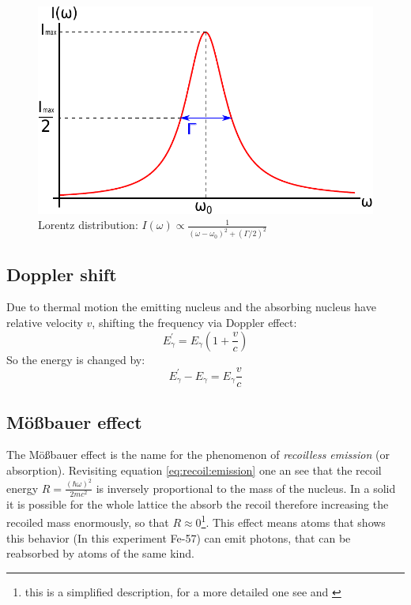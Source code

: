 \begin{figure}[hpbt]
	\centering
	\includegraphics[height=0.25\textheight]{graphics/Lorentz.pdf}
	\caption[Lorentz distribution]{Lorentz distribution: $I(\omega) \propto \frac{1}{(\omega-\omega_0)^2+(\Gamma /2)^2}$\\}
	\label{fig:principles:lorentz}
\end{figure}

\subsection{Doppler shift}
Due to thermal motion the emitting nucleus and the absorbing nucleus have relative velocity $v$, shifting the frequency via Doppler effect:  
\begin{equation}
E_\gamma^{'} = E_\gamma (1+\frac{v}{c}) 
\label{eq:doppler shift}
\end{equation}
So the energy is changed by:
\begin{equation}
E_\gamma^{'} - E_\gamma = E_\gamma \frac{v}{c}
\label{eq:diffdopplershift}
\end{equation}


\subsection{Mößbauer effect}
The Mößbauer effect is the name for the phenomenon of \emph{recoilless emission} (or absorption). Revisiting equation \ref{eq:recoil:emission} one an see that the recoil energy $R=\frac{(\hbar \omega)^2}{2mc^2}$ is inversely proportional to the mass of the nucleus. In a solid it is possible for the whole lattice the absorb the recoil therefore increasing the recoiled mass enormously, so that $R\approx0$\footnote{this is a simplified description, for a more detailed one see \cite{Eyges} and \cite{Wegener} }. This effect means atoms that shows this behavior (In this experiment Fe-57) can emit photons, that can be reabsorbed by atoms of the same kind.

